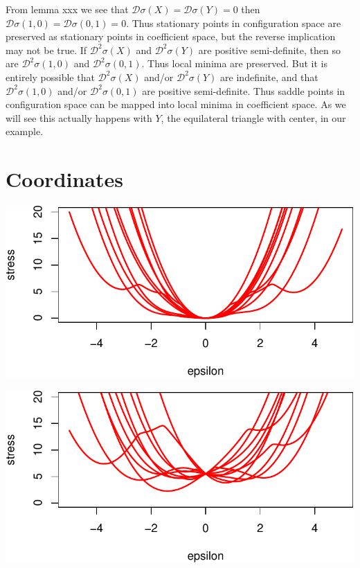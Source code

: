 \documentclass[
  12pt,
  letterpaper,
  DIV=11,
  numbers=noendperiod]{scrreprt}
\theoremstyle{remark}
\begin{document}
From lemma xxx we see that
\(\mathcal{D}\sigma(X)=\mathcal{D}\sigma(Y)=0\) then
\(\mathcal{D}\sigma(1,0)=\mathcal{D}\sigma(0,1)=0\). Thus stationary
points in configuration space are preserved as stationary points in
coefficient space, but the reverse implication may not be true. If
\(\mathcal{D}^2\sigma(X)\) and \(\mathcal{D}^2\sigma(Y)\) are positive
semi-definite, then so are \(\mathcal{D}^2\sigma(1,0)\) and
\(\mathcal{D}^2\sigma(0,1)\). Thus local minima are preserved. But it is
entirely possible that \(\mathcal{D}^2\sigma(X)\) and/or
\(\mathcal{D}^2\sigma(Y)\) are indefinite, and that
\(\mathcal{D}^2\sigma(1,0)\) and/or \(\mathcal{D}^2\sigma(0,1)\) are
positive semi-definite. Thus saddle points in configuration space can be
mapped into local minima in coefficient space. As we will see this
actually happens with \(Y\), the equilateral triangle with center, in
our example.

\section{Coordinates}\label{coordinates}

\includegraphics{spaces_files/figure-pdf/coordinates1-1.pdf}

\includegraphics{spaces_files/figure-pdf/coordinates2-1.pdf}
\end{document}
